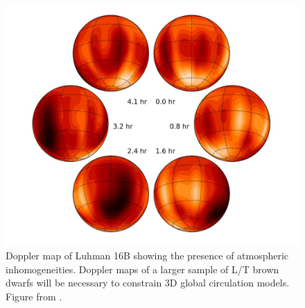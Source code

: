 \documentclass[12pt]{article}
\begin{document}
\begin{justify}
\begin{figure}[tb]
 \begin{center}
 \includegraphics[scale=0.32]{Crossfield2014.png}
\end{center}
\caption{Doppler map of Luhman 16B showing the presence of atmospheric inhomogeneities. Doppler maps of a larger sample of L/T brown dwarfs will be necessary to constrain 3D global circulation models. Figure from \citep{Crossfield2014}.}
 \label{fig:Crossfield2014}
\end{figure}


\end{justify}
\end{document}
